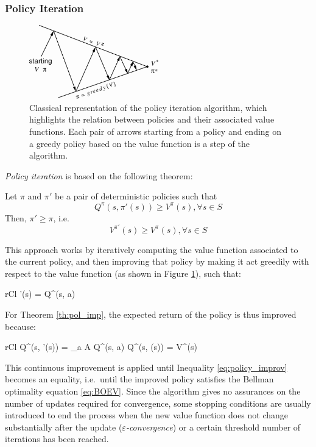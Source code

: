 \subsubsection{Policy Iteration}
%
\begin{figure}
    \includegraphics[width=0.5\textwidth]{pictures/policyiter}
    \centering
    \caption[Policy iteration]{Classical representation of the policy iteration 
	    algorithm, which highlights the relation between policies and their 
	    associated value functions. Each pair of arrows starting from a 
	    policy and ending on a greedy policy based on the value function is 
	    a step of the algorithm.}
    \label{f:policyiter}
\end{figure}
%
\textit{Policy iteration} is based on the following theorem:
\begin{theorem} \label{th:pol_imp}
    Let $\pi$ and $\pi'$ be a pair of deterministic policies such that
    \[
        Q^\pi(s, \pi'(s)) \ge V^\pi(s), \forall s \in S 
    \]
    Then, $\pi' \ge \pi$, i.e.\ 
    \[
        V^{\pi'}(s) \ge V^{\pi}(s), \forall s \in S
    \]
\end{theorem}

This approach works by iteratively computing the value function associated to 
the current policy, and then improving that policy by making it act greedily 
with respect to the value function (as shown in Figure \ref{f:policyiter}), such
that:
%
\begin{IEEEeqnarray}{rCl}
    \pi'(s) =  Q^{\pi}(s, a) \label{eq:greedy_imp}
\end{IEEEeqnarray}
%
For Theorem \ref{th:pol_imp}, the expected return of the policy is thus improved
because:
%
\begin{IEEEeqnarray}{rCl}	
    Q^\pi(s, \pi'(s)) = \max_{a \in A} Q^\pi(s, a) \ge Q^\pi(s, \pi(s)) = V^\pi(s) \label{eq:policy_improv}
\end{IEEEeqnarray}
%
This continuous improvement is applied until Inequality \eqref{eq:policy_improv} 
becomes an equality, i.e.\ until the improved policy satisfies the 
Bellman optimality equation \eqref{eq:BOEV}. Since the algorithm gives no 
assurances on the number of updates required for convergence, some stopping
conditions are usually introduced to end the process when the new value function 
does not change substantially after the update 
(\textit{$\varepsilon$-convergence}) or a certain threshold number of iterations
has been reached.

